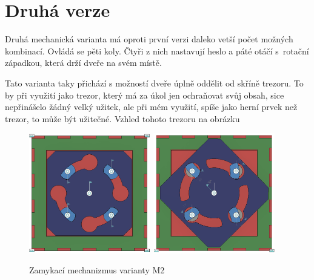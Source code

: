 \section{Druhá verze}

Druhá mechanická varianta má oproti první verzi daleko vetší počet možných kombinací.
Ovládá se pěti koly. Čtyři z nich nastavují heslo a páté otáčí s~rotační západkou, která drží dveře na svém místě.

Tato varianta taky přichází s možností dveře úplně oddělit od skříně trezoru. To by při využití jako trezor, který
má za úkol jen ochraňovat svůj obsah, sice nepřinášelo žádný velký užitek, ale při mém využití, spíše jako herní 
prvek než trezor, to může být užitečné. Vzhled tohoto trezoru na obrázku 

\begin{figure}[htbp]
    \centering
    \includegraphics[width=150pt]{kapitoly/obrazky/M2/mechanizmus_odemcen.png}
    \includegraphics[width=150pt]{kapitoly/obrazky/M2/mechanizmus_zamceno.png}
    \caption{Zamykací mechanizmus varianty M2}
    \label{fig:M2-mechanizmus}
\end{figure}

\newpage